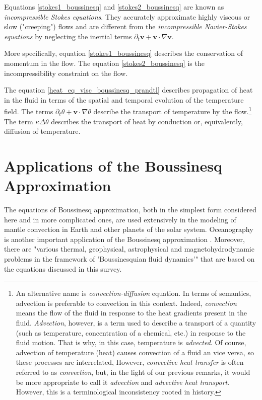 \documentclass[
10pt, %
a4paper, %
oneside, %
headinclude,footinclude, %
BCOR5mm, %
]{scrartcl}
\providecommand{\velocity}{\mathbf{v}}
\providecommand{\partialTimeVel}{\partial_t\velocity}
\providecommand{\inertTermVel}{\velocity\cdot\nabla \velocity}
\providecommand{\partialTimeTemp}{\partial_t\theta}
\providecommand{\inertTermTemp}{\velocity\cdot\nabla\theta}
\providecommand{\laplacianTemp}{\Delta\theta}
\begin{document}
Equations \ref{stokes1_boussinesq} and \ref{stokes2_boussinesq} are known as \emph{incompressible Stokes equations}. They accurately approximate highly viscous or slow ("creeping") flows and are different from the \emph{incompressible Navier-Stokes equations} by neglecting the inertial terms $\partialTimeVel + \inertTermVel$.

More specifically, equation \ref{stokes1_boussinesq} describes the conservation of momentum in the flow. The equation \ref{stokes2_boussinesq} is the incompressibility constraint on the flow.

The equation \ref{heat_eq_visc_boussinesq_prandtl} describes propagation of heat in the fluid in terms of the spatial and temporal evolution of the temperature field. The terms $\partialTimeTemp + \inertTermTemp$ describe the transport of temperature by the flow.\footnote{An alternative name is \emph{convection-diffusion} equation. In terms of semantics, advection is preferable to convection in this context. Indeed, \emph{convection} means the flow of the fluid in response to the heat gradients present in the fluid. \emph{Advection}, however, is a term used to describe a transport of a quantity (such as temperature, concentration of a chemical, etc.) in response to the fluid motion. That is why, in this case, temperature is \emph{advected}. Of course, advection of temperature (heat) causes convection of a fluid an vice versa, so these processes are interrelated, However, \emph{convective heat transfer} is often referred to as \emph{convection}, but, in the light of our previous remarks, it would be more appropriate to call it \emph{advection} and \emph{advective heat transport}. However, this is a terminological inconsistency rooted in history.} The term $\kappa \laplacianTemp$ describes the transport of heat by conduction or, equivalently, diffusion of temperature.

\section{Applications of the Boussinesq Approximation}

The equations of Boussinesq approximation, both in the simplest form considered here and in more complicated ones, are used extensively in the modeling of mantle convection in Earth and other planets of the solar system. \cite{mantle_conv_in_earth_and_planets} Oceanography is another important application of the Boussinesq approximation \cite{miesen}. Moreover, there are "various thermal, geophysical, astrophysical and magnetohydrodynamic problems in the framework of 'Boussinesquian fluid dynamics'" that are based on the equations discussed in this survey. \cite{boussinesq_and_his_approximation} 
\end{document}
